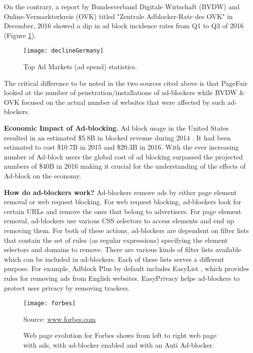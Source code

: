 \documentclass[runningheads,a4paper]{llncs}
\begin{document}
On the contrary, a report by Bundesverband Digitale Wirtschaft (BVDW) and Online-Vermarkterkreis (OVK) titled  "Zentrale Adblocker-Rate des OVK" \cite{declineGermany} in December, 2016 showed a dip in ad block incidence rates from Q1 to Q3 of 2016 (Figure \ref{fig:declineGermany}). \begin{figure}
\centering
\texttt{[image: declineGermany]}
\caption{Top Ad Markets (ad spend) statistics.\cite{declineGermany}}
\label{fig:declineGermany}
\end{figure}

The critical difference to be noted in the two sources cited above is that PageFair looked at the number of penetration/installations of ad-blockers while BVDW \& OVK focused on the actual number of websites that were affected by such ad-blockers.

\textbf{Economic Impact of Ad-blocking.} Ad block usage in the United States resulted in an estimated \$5.8B in blocked revenue during 2014 \cite{costBlock}. It had been estimated to cost \$10.7B in 2015 and \$20.3B in 2016. With the ever increasing number of Ad-block users the global cost of ad blocking surpassed the projected numbers of \$40B in 2016 making it crucial for the understanding of the effects of Ad-block on the economy.

\textbf{How do ad-blockers work?} Ad-blockers remove
ads by either page element removal or web request blocking. For web request blocking, ad-blockers look for certain URLs and remove the ones that belong to advertisers. For page element removal, ad-blockers use various CSS selectors to access elements and end up removing them. For both of these actions, ad-blockers are dependent on filter lists that contain the set of rules (as regular expressions) specifying the element selectors and domains to remove. There are various kinds of filter lists available which can be included in ad-blockers. Each of these lists serves a different purpose. For example, Adblock Plus by default includes EasyList \cite{easyList}, which provides rules for removing ads from English websites. EasyPrivacy \cite{easyPrivacy} helps ad-blockers to protect user privacy by removing trackers.

\begin{figure}
\centering
\texttt{[image: forbes]}
\caption{Web page evolution for Forbes shows from left to right web page with ads, with ad-blocker enabled and with an Anti Ad-blocker.}
Source: \url{www.forbes.com}
\label{fig:forbes}
\end{figure}
\end{document}

